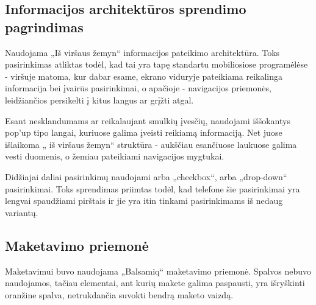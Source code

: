 \documentclass{VUMIFPSkursinis}
\begin{document}
\subsection{Informacijos architektūros sprendimo pagrindimas}
Naudojama „Iš viršaus žemyn“ informacijos pateikimo architektūra. Toks pasirinkimas atliktas todėl, kad tai yra tapę standartu mobiliosiose programėlėse - viršuje matoma, kur dabar esame, ekrano viduryje pateikiama reikalinga informacija bei įvairūs pasirinkimai, o apačioje - navigacijos priemonės, leidžiančios persikelti į kitus langus ar grįžti atgal. 

Esant nesklandumams ar reikalaujant smulkių įvesčių, naudojami iššokantys pop'up tipo langai, kuriuose galima įveisti reikiamą informaciją. Net juose išlaikoma „ iš viršaus žemyn“ struktūra - aukščiau esančiuose laukuose galima vesti duomenis, o žemiau pateikiami navigacijos mygtukai.

Didžiajai daliai pasirinkimų naudojami arba „checkbox“, arba „drop-down“ pasirinkimai. Toks sprendimas priimtas todėl, kad telefone šie pasirinkimai yra lengvai spaudžiami pirštais ir jie yra itin tinkami pasirinkimams iš nedaug variantų. 

\subsection{Maketavimo priemonė}
Maketavimui buvo naudojama „Balsamiq“ maketavimo priemonė. Spalvos nebuvo naudojamos, tačiau elementai, ant kurių makete galima paspausti, yra išryškinti oranžine spalva, netrukdančia suvokti bendrą maketo vaizdą.

























\printbibliography[heading=bibintoc, title=Šaltiniai]  %
\end{document}
